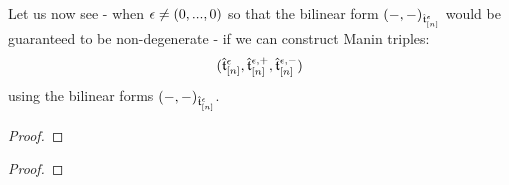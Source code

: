             Let us now see - when $\epsilon \not = (0, ..., 0)$ so that the bilinear form $(-, -)_{\hat{\mathfrak{t}}_{[n]}^{\epsilon}}$ would be guaranteed to be non-degenerate - if we can construct Manin triples:
                $$( \hat{\mathfrak{t}}_{[n]}^{\epsilon}, \hat{\mathfrak{t}}_{[n]}^{\epsilon, +}, \hat{\mathfrak{t}}_{[n]}^{\epsilon, -} )$$
            using the bilinear forms $(-, -)_{ \hat{\mathfrak{t}}_{[n]}^{\epsilon} }$. 
            \begin{theorem} \label{theorem: exact_toroidal_manin_triples}
                
            \end{theorem}
                \begin{proof}
                    
                \end{proof}
            \begin{corollary} \label{coro: exact_toroidal_lie_bialgebras}
                
            \end{corollary}
                \begin{proof}
                    
                \end{proof}
            
    \printbibliography

